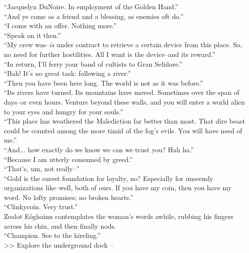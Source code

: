 “Jacquelyn DuNoire. In employment of the Golden Hand.”\\

“And ye come as a friend and a blessing, as enemies oft do.”\\

“I come with an offer. Nothing more.”\\

“Speak on it then.”\\

“My crew was--\emph{is} under contract to retrieve a certain device from this place. So, no need for further hostilities. All I want is the device--and its reward.”\\

“In return, I’ll ferry your band of cultists to Gran Selidore.”\\

“Bah! It’s no great task: following a river.”\\

“Then you have been here long. The world is not as it was before.”\\

“Its rivers have turned. Its mountains have moved. Sometimes over the span of days--or even hours. Venture beyond these walls, and you will enter a world alien to your eyes and hungry for your souls.”\\

“This place has weathered the Malediction far better than most. That dire beast could be counted among the more timid of the fog’s evils. You will have need of me.”\\

“And... how exactly do we know we can we trust you? Hah ha.”\\

“Because I am utterly consumed by greed.”\\

“That’s, um, not really--”\\

“Gold is the surest foundation for loyalty, no? Especially for unseemly organizations like--well, both of ours. If you have my coin, then you have my word. No lofty promises; no broken hearts.”\\

“Clinkycoin. Very trust.”\\

Zealot Eóghainn contemplates the woman’s words awhile, rubbing his fingers across his chin, and then finally nods.\\

“Champion. See to the hireling.”\\

>> Explore the underground dock -- 